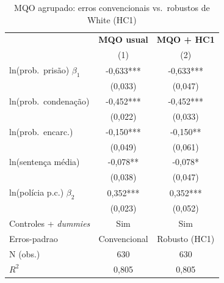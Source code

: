 \begin{table}[htbp]\centering
\caption{MQO agrupado: erros convencionais vs.\ robustos de White (HC1)}\label{tab:q3_robusto}
\small
\begin{tabular}{lcc}
\toprule
 & \textbf{MQO usual} & \textbf{MQO + HC1} \\
 & (1) & (2) \\
\midrule
ln(prob.\ pris\~ao) $\beta_1$ & -0,633*** & -0,633*** \\
 & (0,033) & (0,047) \\
ln(prob.\ condena\c{c}\~ao) & -0,452*** & -0,452*** \\
 & (0,022) & (0,033) \\
ln(prob.\ encarc.) & -0,150*** & -0,150** \\
 & (0,049) & (0,061) \\
ln(senten\c{c}a m\'edia) & -0,078** & -0,078* \\
 & (0,038) & (0,047) \\
ln(pol\'icia p.c.) $\beta_2$ & 0,352*** & 0,352*** \\
 & (0,023) & (0,052) \\
\midrule
Controles + \textit{dummies} & Sim & Sim \\
Erros-padrao & Convencional & Robusto (HC1) \\
N (obs.) & 630 & 630 \\
$R^2$ & 0,805 & 0,805 \\
\bottomrule
\end{tabular}
\par\vspace{2pt}{\footnotesize\itshape Erros-padrao entre parenteses. *** p$<$0,01; ** p$<$0,05; * p$<$0,10. Variavel dependente: ln(taxa de crime).}
\end{table}
